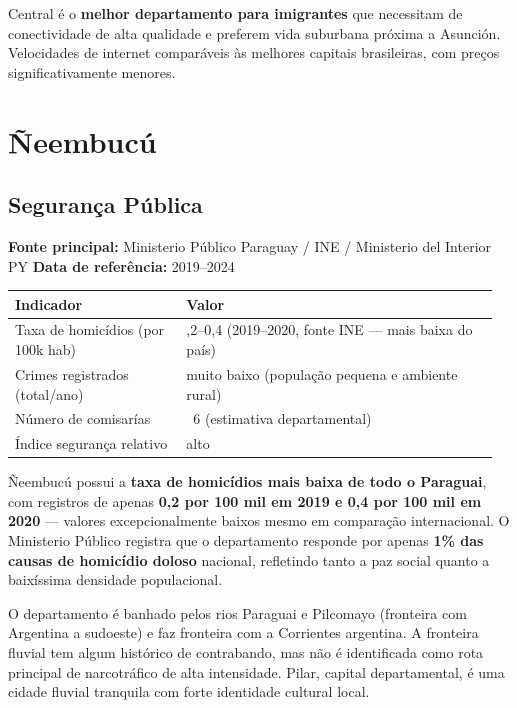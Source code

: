 Central é o \textbf{melhor departamento para imigrantes} que necessitam de conectividade de alta qualidade e preferem vida suburbana próxima a Asunción. Velocidades de internet comparáveis às melhores capitais brasileiras, com preços significativamente menores.





\clearpage
\section{Ñeembucú}
\label{sec:dept_12_Neembucu}

\subsection{Segurança Pública}

\textbf{Fonte principal:} Ministerio Público Paraguay / INE / Ministerio del Interior PY
\textbf{Data de referência:} 2019--2024


{\small
\setlength{\tabcolsep}{3pt}
\renewcommand{\arraystretch}{1.12}
\begin{tabularx}{\linewidth}{>{\raggedright\arraybackslash}p{0.34\linewidth} >{\raggedright\arraybackslash}p{0.62\linewidth}}
\toprule
Indicador & Valor \\
\midrule
Taxa de homicídios (por 100k hab) & 0,2--0,4 (2019--2020, fonte INE --- mais baixa do país) \\
Crimes registrados (total/ano) & muito baixo (população pequena e ambiente rural) \\
Número de comisarías & ~6 (estimativa departamental) \\
Índice segurança relativo & alto \\
\bottomrule
\end{tabularx}
}


Ñeembucú possui a \textbf{taxa de homicídios mais baixa de todo o Paraguai}, com registros de apenas \textbf{0,2 por 100 mil em 2019 e 0,4 por 100 mil em 2020} --- valores excepcionalmente baixos mesmo em comparação internacional. O Ministerio Público registra que o departamento responde por apenas \textbf{1\% das causas de homicídio doloso} nacional, refletindo tanto a paz social quanto a baixíssima densidade populacional.

O departamento é banhado pelos rios Paraguai e Pilcomayo (fronteira com Argentina a sudoeste) e faz fronteira com a Corrientes argentina. A fronteira fluvial tem algum histórico de contrabando, mas não é identificada como rota principal de narcotráfico de alta intensidade. Pilar, capital departamental, é uma cidade fluvial tranquila com forte identidade cultural local.

